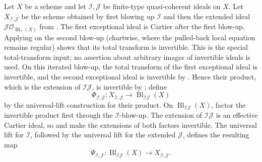 \begin{definition}
  \label{def:nagata-blowup-product-comparison}
  \leanok

  Let $X$ be a scheme and let $\mathcal I,\mathcal J$ be finite-type
  quasi-coherent ideals on $X$.  Let $X_{\mathcal I,\mathcal J}$ be the
  scheme obtained by first blowing up $\mathcal I$ and then the extended
  ideal $\mathcal J\mathcal O_{\operatorname{Bl}_{\mathcal I}(X)}$ from
  .
  The first exceptional ideal is Cartier after the first blow-up.  Applying
   on the second blow-up
  (chartwise, where the pulled-back local equation remains regular) shows
  that its total transform is invertible.  This is the special total-transform
  input; no assertion about arbitrary images of invertible ideals is used.
  On this iterated blow-up, the total transform
  of the first exceptional ideal is invertible, and the second exceptional
  ideal is invertible by .
  Hence their product, which is the extension of
  $\mathcal I\mathcal J$, is invertible by
  ; define
  \[
    \Phi_{\mathcal I,\mathcal J}\colon
      X_{\mathcal I,\mathcal J}
      \longrightarrow\operatorname{Bl}_{\mathcal I\mathcal J}(X)
  \]
  by the universal-lift construction for their product.  On
  $\operatorname{Bl}_{\mathcal I\mathcal J}(X)$, factor the invertible
  product first through the $\mathcal I$-blow-up.  The extension of
  $\mathcal I\mathcal J$ is an effective Cartier ideal, so
   and
   make the extensions
  of both factors invertible.  The universal lift for $\mathcal I$, followed
  by the universal lift for the extended $\mathcal J$, defines the resulting
  map
  \[
    \Psi_{\mathcal I,\mathcal J}\colon
      \operatorname{Bl}_{\mathcal I\mathcal J}(X)
      \longrightarrow X_{\mathcal I,\mathcal J}.
  \]
\end{definition}

